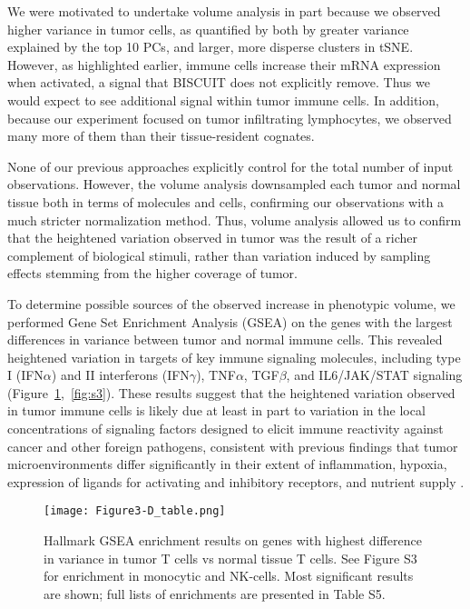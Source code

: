 We were motivated to undertake volume analysis in part because we observed higher variance in tumor cells, as quantified by both by greater variance explained by the top 10 PCs, and larger, more disperse clusters in tSNE\@.
However, as highlighted earlier, immune cells increase their mRNA expression when activated, a signal that BISCUIT does not explicitly remove. 
Thus we would expect to see additional signal within tumor immune cells.
In addition, because our experiment focused on tumor infiltrating lymphocytes, we observed many more of them than their tissue-resident cognates.

None of our previous approaches explicitly control for the total number of input observations. 
However, the volume analysis downsampled each tumor and normal tissue both in terms of molecules and cells, confirming our observations with a much stricter normalization method. 
Thus, volume analysis allowed us to confirm that the heightened variation observed in tumor was the result of a richer complement of biological stimuli, rather than variation induced by sampling effects stemming from the higher coverage of tumor. 

To determine possible sources of the observed increase in phenotypic volume, we performed Gene Set Enrichment Analysis (GSEA) \citep{Subramanian2005} on the genes with the largest differences in variance between tumor and normal immune cells. 
This revealed heightened variation in targets of key immune signaling molecules, including type I (IFN$\alpha$) and II interferons (IFN$\gamma$), TNF$\alpha$, TGF$\beta$, and IL6/JAK/STAT signaling (Figure~\ref{fig:3d},~\ref{fig:s3}). %
These results suggest that the heightened variation observed in tumor immune cells is likely due at least in part to variation in the local concentrations of signaling factors designed to elicit immune reactivity against cancer and other foreign pathogens, consistent with previous findings that tumor microenvironments differ significantly in their extent of inflammation, hypoxia, expression of ligands for activating and inhibitory receptors, and nutrient supply \citep{Finger2010,Jimenez-Sanchez2017}.

\begin{figure}
\centering
\texttt{[image: Figure3-D\_table.png]}
\caption{Hallmark GSEA enrichment results on genes with highest difference in variance in tumor T cells vs normal tissue T cells.
  See Figure S3 for enrichment in monocytic and NK-cells.
  Most significant results are shown; full lists of enrichments are presented in Table S5. %
}
\label{fig:3d}
\end{figure}

